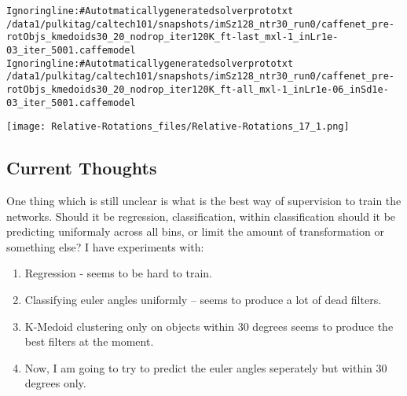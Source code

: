 \documentclass[letterpaper,10pt,english]{/usr/share/sphinx/texinputs/sphinxhowto}
\newenvironment{InvisibleVerbatim}
        {\begin{mdframed}[leftmargin=0.1\linewidth,innerleftmargin=3pt,innerrightmargin=3pt, userdefinedwidth=1\linewidth, linewidth=0pt, linecolor=white, usetwoside=false]}
        {\end{mdframed}}
\begin{document}
        

            
                \begin{InvisibleVerbatim}
                \vspace{-0.5\baselineskip}
\begin{alltt}Ignoring line: \# Autotmatically generated solver prototxt
/data1/pulkitag/caltech101/snapshots/imSz128\_ntr30\_run0/caffenet\_pre-
rotObjs\_kmedoids30\_20\_nodrop\_iter120K\_ft-last\_mxl-1\_inLr1e-
03\_iter\_5001.caffemodel
Ignoring line: \# Autotmatically generated solver prototxt
/data1/pulkitag/caltech101/snapshots/imSz128\_ntr30\_run0/caffenet\_pre-
rotObjs\_kmedoids30\_20\_nodrop\_iter120K\_ft-all\_mxl-1\_inLr1e-06\_inSd1e-
03\_iter\_5001.caffemodel
\end{alltt}

            \end{InvisibleVerbatim}
            
                \begin{InvisibleVerbatim}
                \vspace{-0.5\baselineskip}
    \begin{center}
    \texttt{[image: Relative-Rotations\_files/Relative-Rotations\_17\_1.png]}
    \par
    \end{center}
    
            \end{InvisibleVerbatim}
            
        
    
\subsection{Current Thoughts}\label{current-thoughts}

One thing which is still unclear is what is the best way of supervision
to train the networks. Should it be regression, classification, within
classification should it be predicting uniformaly across all bins, or
limit the amount of transformation or something else? I have experiments
with:

\begin{enumerate}
\def\labelenumi{\arabic{enumi}.}
\itemsep1pt\parskip0pt
\item
  Regression - seems to be hard to train.
\item
  Classifying euler angles uniformly -- seems to produce a lot of dead
  filters.
\item
  K-Medoid clustering only on objects within 30 degrees seems to produce
  the best filters at the moment.
\item
  Now, I am going to try to predict the euler angles seperately but
  within 30 degrees only.
\end{enumerate}
\end{document}
